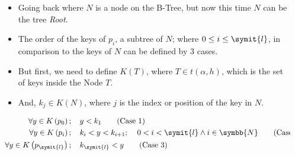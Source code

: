 \documentclass{beamer}
\begin{document}
\begin{frame}
    \begin{columns}
        \begin{column}{\textlecolumn}
            \begin{block}{}
                \begin{itemize}
                    \item Going back where \(N\) is a node on the B-Tree, but now this time \(N\) can be the tree \emph{Root}.
                    \item The order of the keys of \(p_i\), a subtree of \(N\); where \(0 \leq i \leq \symit{l}\), in comparison to the keys of \(N\) can be defined by 3 cases.
                    \item But first, we need to define \(K\left(T\right)\), where \(T \in t\left(\alpha, h\right)\), which is the set of keys inside the Node \(T\).
                    \item And, \(k_j \in K\left(N\right)\), where \(j\) is the index or position of the key in \(N\).
                \end{itemize}
                \vspace{0.5cm}
                \begin{align}
                    \forall y \in K\left(p_0\right);\mspace{20mu}& y < k_1 \tag{Case 1}\label{case1-subt-t-comp} \\
                    \forall y \in K\left(p_{i}\right);\mspace{20mu}& k_i < y < k_{i + 1};\mspace{20mu} 0 < i < \symit{l} \wedge i \in \symbb{N} \tag{Case 2}\label{case2-subt-t-comp} \\
                    \forall y \in K\left(p_{\symit{l}}\right);\mspace{20mu}& k_{\symit{l}} < y \tag{Case 3}\label{case3-subt-t-comp}
                \end{align}
            \end{block}
        \end{column}
        \begin{column}{\textricolumn}
            \begin{block}{}
            \end{block}
        \end{column}
    \end{columns}
    
    \framebreak


\end{frame}
\end{document}
